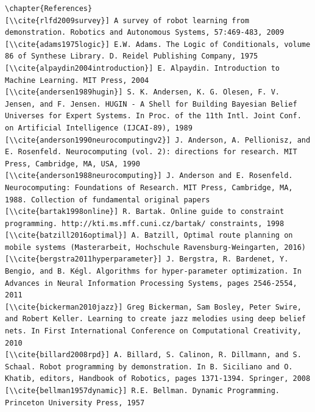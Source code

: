 \documentclass[10pt]{book}
\begin{document}
\begin{verbatim}
\chapter{References}
[\\cite{rlfd2009survey}] A survey of robot learning from demonstration. Robotics and Autonomous Systems, 57:469-483, 2009
[\\cite{adams1975logic}] E.W. Adams. The Logic of Conditionals, volume 86 of Synthese Library. D. Reidel Publishing Company, 1975
[\\cite{alpaydin2004introduction}] E. Alpaydin. Introduction to Machine Learning. MIT Press, 2004
[\\cite{andersen1989hugin}] S. K. Andersen, K. G. Olesen, F. V. Jensen, and F. Jensen. HUGIN - A Shell for Building Bayesian Belief Universes for Expert Systems. In Proc. of the 11th Intl. Joint Conf. on Artificial Intelligence (IJCAI-89), 1989
[\\cite{anderson1990neurocomputingv2}] J. Anderson, A. Pellionisz, and E. Rosenfeld. Neurocomputing (vol. 2): directions for research. MIT Press, Cambridge, MA, USA, 1990
[\\cite{anderson1988neurocomputing}] J. Anderson and E. Rosenfeld. Neurocomputing: Foundations of Research. MIT Press, Cambridge, MA, 1988. Collection of fundamental original papers
[\\cite{bartak1998online}] R. Bartak. Online guide to constraint programming. http://kti.ms.mff.cuni.cz/bartak/ constraints, 1998
[\\cite{batzill2016optimal}] A. Batzill, Optimal route planning on mobile systems (Masterarbeit, Hochschule Ravensburg-Weingarten, 2016)
[\\cite{bergstra2011hyperparameter}] J. Bergstra, R. Bardenet, Y. Bengio, and B. Kégl. Algorithms for hyper-parameter optimization. In Advances in Neural Information Processing Systems, pages 2546-2554, 2011
[\\cite{bickerman2010jazz}] Greg Bickerman, Sam Bosley, Peter Swire, and Robert Keller. Learning to create jazz melodies using deep belief nets. In First International Conference on Computational Creativity, 2010
[\\cite{billard2008rpd}] A. Billard, S. Calinon, R. Dillmann, and S. Schaal. Robot programming by demonstration. In B. Siciliano and O. Khatib, editors, Handbook of Robotics, pages 1371-1394. Springer, 2008
[\\cite{bellman1957dynamic}] R.E. Bellman. Dynamic Programming. Princeton University Press, 1957

\end{verbatim}
\end{document}
